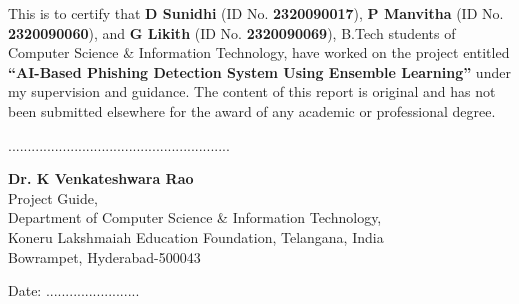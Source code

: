 \begin{doublespace}
This is to certify that \textbf{D Sunidhi} (ID No. \textbf{2320090017}),
\textbf{P Manvitha} (ID No. \textbf{2320090060}), and
\textbf{G Likith} (ID No. \textbf{2320090069}), B.Tech students of
Computer Science \& Information Technology, have worked on the project
entitled \textbf{``AI-Based Phishing Detection System Using Ensemble Learning''}
under my supervision and guidance. The content of this report is original
and has not been submitted elsewhere for the award of any academic or
professional degree.
\end{doublespace}

\par\null\par\par\null\par\par\null\par\par\null\par
\begin{flushleft}
.........................................................\\
\par\null\par
\textbf{Dr. K Venkateshwara Rao}\\
Project Guide,\\
Department of Computer Science \& Information Technology,\\
Koneru Lakshmaiah Education Foundation, Telangana, India\\
Bowrampet, Hyderabad-500043\\
\end{flushleft}
\par\null\par\par\null\par
Date: ........................
